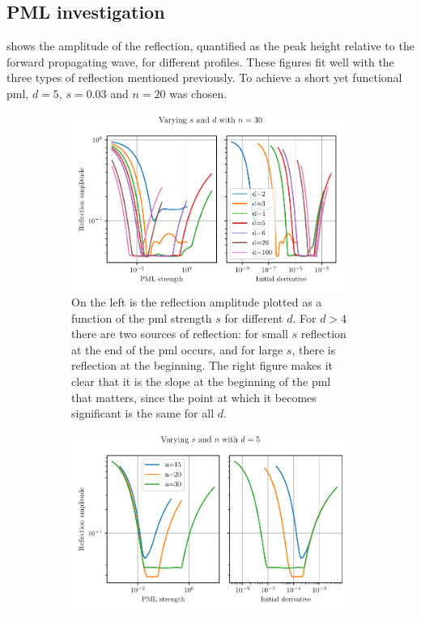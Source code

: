 \subsection{PML investigation}

 shows the amplitude of the reflection,
quantified as the peak height relative to the forward propagating wave,
for different profiles.
These figures fit well with the three types of reflection mentioned previously.
To achieve a short yet functional \gls{pml}, $d=5$, $s=0.03$ and $n=20$ was
chosen.

\begin{figure}[htpb]
	\centering
	\begin{subfigure}[]{\textwidth}
	\begin{center}
		\includegraphics{chapters/methods/pml_sweep_sd.pdf}
	\end{center}
	\caption{
		On the left is the reflection amplitude plotted as a function of the
		\gls{pml} strength $s$ for different $d$.
		For $d > 4$ there are two sources of reflection:
		for small $s$ reflection at the end of the \gls{pml} occurs,
		and for large $s$, there is reflection at the beginning.
		The right figure makes it clear that it is the slope at the beginning of
		the \gls{pml} that matters, since the point at which it becomes
		significant is the same for all $d$.
	}
	\label{fig:pml_sweep_sd}
	\end{subfigure}
	\begin{subfigure}[]{\textwidth}
	\begin{center}
		\includegraphics{chapters/methods/pml_sweep_sn.pdf}

\end{center}
\end{subfigure}
\end{figure}
